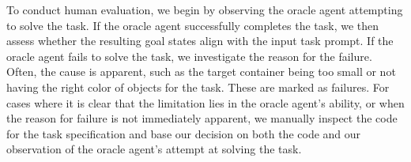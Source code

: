\documentclass{article}
\theoremstyle{plain}
\theoremstyle{definition}
\theoremstyle{remark}
\begin{document}
To conduct human evaluation, we begin by observing the oracle agent attempting to solve the task. If the oracle agent successfully completes the task, we then assess whether the resulting goal states align with the input task prompt. If the oracle agent fails to solve the task, we investigate the reason for the failure. Often, the cause is apparent, such as the target container being too small or not having the right color of objects for the task. These are marked as failures. For cases where it is clear that the limitation lies in the oracle agent's ability, or when the reason for failure is not immediately apparent, we manually inspect the code for the task specification and base our decision on both the code and our observation of the oracle agent's attempt at solving the task.


\begin{table}[]
\end{table}
\end{document}
